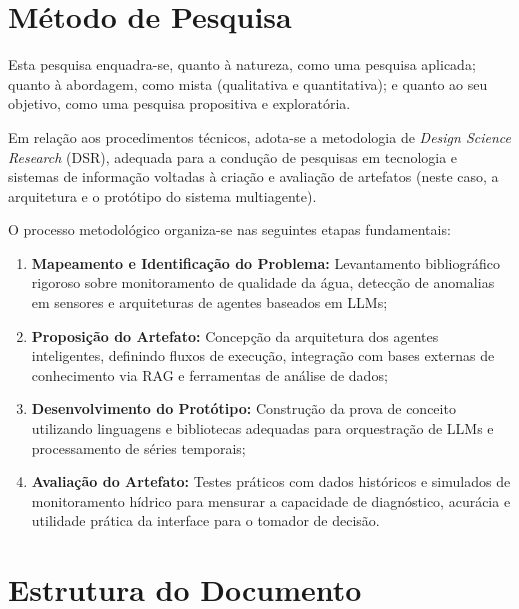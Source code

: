 \section{Método de Pesquisa}

Esta pesquisa enquadra-se, quanto à natureza, como uma pesquisa aplicada; quanto à abordagem, como mista (qualitativa e quantitativa); e quanto ao seu objetivo, como uma pesquisa propositiva e exploratória. 

Em relação aos procedimentos técnicos, adota-se a metodologia de \textit{Design Science Research} (DSR), adequada para a condução de pesquisas em tecnologia e sistemas de informação voltadas à criação e avaliação de artefatos (neste caso, a arquitetura e o protótipo do sistema multiagente). 

O processo metodológico organiza-se nas seguintes etapas fundamentais:
\begin{enumerate}
    \item \textbf{Mapeamento e Identificação do Problema:} Levantamento bibliográfico rigoroso sobre monitoramento de qualidade da água, detecção de anomalias em sensores e arquiteturas de agentes baseados em LLMs;
    \item \textbf{Proposição do Artefato:} Concepção da arquitetura dos agentes inteligentes, definindo fluxos de execução, integração com bases externas de conhecimento via RAG e ferramentas de análise de dados;
    \item \textbf{Desenvolvimento do Protótipo:} Construção da prova de conceito utilizando linguagens e bibliotecas adequadas para orquestração de LLMs e processamento de séries temporais;
    \item \textbf{Avaliação do Artefato:} Testes práticos com dados históricos e simulados de monitoramento hídrico para mensurar a capacidade de diagnóstico, acurácia e utilidade prática da interface para o tomador de decisão.
\end{enumerate}

\section{Estrutura do Documento}

